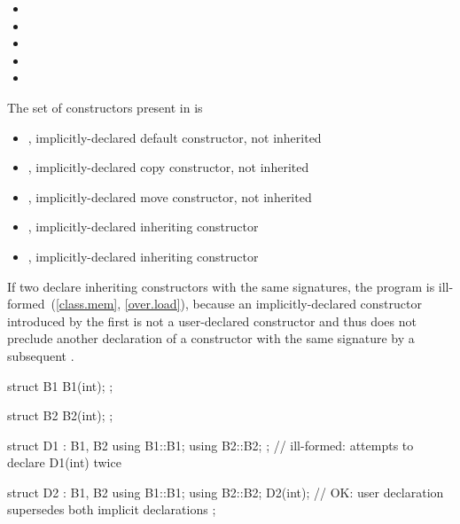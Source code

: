 \begin{itemize}
\item {}
\item {}
\item {}
\item {}
\item {}
\end{itemize}

The set of constructors present in  is

\begin{itemize}
\item {}, implicitly-declared default constructor, not inherited
\item {}, implicitly-declared copy constructor, not inherited
\item {}, implicitly-declared move constructor, not inherited
\item {}, implicitly-declared inheriting constructor
\item {}, implicitly-declared inheriting constructor
\end{itemize}
\exitexample

\pnum
\enternote If two  declare inheriting constructors with the same
signatures, the program is ill-formed~(\ref{class.mem}, \ref{over.load}), because an
implicitly-declared constructor introduced by the first  is not a
user-declared constructor and thus does not preclude another declaration of a constructor with the
same signature by a subsequent . \enterexample

\begin{codeblock}
struct B1 {
  B1(int);
};

struct B2 {
  B2(int);
};

struct D1 : B1, B2 {
  using B1::B1;
  using B2::B2;     
};                  // ill-formed: attempts to declare D1(int) twice

struct D2 : B1, B2 {
  using B1::B1;
  using B2::B2;
  D2(int);          // OK: user declaration supersedes both implicit declarations
};
\end{codeblock}
\exitexample \exitnote

